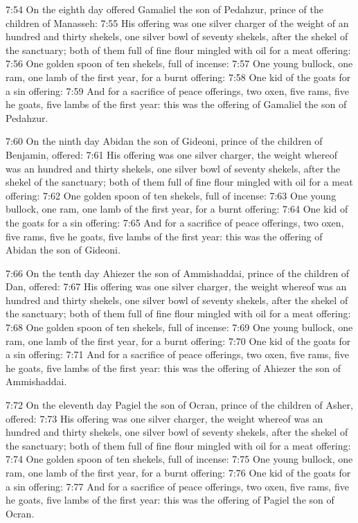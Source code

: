7:54 On the eighth day offered Gamaliel the son of Pedahzur, prince of the children of Manasseh: 7:55 His offering was one silver charger of the weight of an hundred and thirty shekels, one silver bowl of seventy shekels, after the shekel of the sanctuary; both of them full of fine flour mingled with oil for a meat offering: 7:56 One golden spoon of ten shekels, full of incense: 7:57 One young bullock, one ram, one lamb of the first year, for a burnt offering: 7:58 One kid of the goats for a sin offering: 7:59 And for a sacrifice of peace offerings, two oxen, five rams, five he goats, five lambs of the first year: this was the offering of Gamaliel the son of Pedahzur.

7:60 On the ninth day Abidan the son of Gideoni, prince of the children of Benjamin, offered: 7:61 His offering was one silver charger, the weight whereof was an hundred and thirty shekels, one silver bowl of seventy shekels, after the shekel of the sanctuary; both of them full of fine flour mingled with oil for a meat offering: 7:62 One golden spoon of ten shekels, full of incense: 7:63 One young bullock, one ram, one lamb of the first year, for a burnt offering: 7:64 One kid of the goats for a sin offering: 7:65 And for a sacrifice of peace offerings, two oxen, five rams, five he goats, five lambs of the first year: this was the offering of Abidan the son of Gideoni.

7:66 On the tenth day Ahiezer the son of Ammishaddai, prince of the children of Dan, offered: 7:67 His offering was one silver charger, the weight whereof was an hundred and thirty shekels, one silver bowl of seventy shekels, after the shekel of the sanctuary; both of them full of fine flour mingled with oil for a meat offering: 7:68 One golden spoon of ten shekels, full of incense: 7:69 One young bullock, one ram, one lamb of the first year, for a burnt offering: 7:70 One kid of the goats for a sin offering: 7:71 And for a sacrifice of peace offerings, two oxen, five rams, five he goats, five lambs of the first year: this was the offering of Ahiezer the son of Ammishaddai.

7:72 On the eleventh day Pagiel the son of Ocran, prince of the children of Asher, offered: 7:73 His offering was one silver charger, the weight whereof was an hundred and thirty shekels, one silver bowl of seventy shekels, after the shekel of the sanctuary; both of them full of fine flour mingled with oil for a meat offering: 7:74 One golden spoon of ten shekels, full of incense: 7:75 One young bullock, one ram, one lamb of the first year, for a burnt offering: 7:76 One kid of the goats for a sin offering: 7:77 And for a sacrifice of peace offerings, two oxen, five rams, five he goats, five lambs of the first year: this was the offering of Pagiel the son of Ocran.

